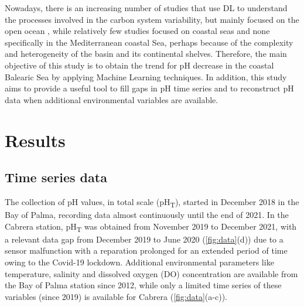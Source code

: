 Nowadays, there is an increasing number of studies that use  DL to
understand the processes involved in the carbon system variability, but mainly
focused on the open ocean \cite{Fourrier2020,Friedrich2009,Bittig2018,
    Landschützer2013,Broullon2019}, while relatively few studies focused on
coastal
seas \cite{Broullon2021,Contractor2021} and none specifically in the
Mediterranean coastal Sea, perhaps because of the complexity and heterogeneity
of the basin and its continental shelves. Therefore, the main objective of this
study is to obtain the trend for pH decrease in the coastal Balearic Sea by
applying Machine Learning techniques. In addition, this study aims to provide a
useful tool to fill gaps in pH time series and to reconstruct pH data when
additional environmental variables are available.

\section{Results}
\subsection{Time series data}

The collection of pH values, in total scale (pH\textsubscript{T}), started
in December 2018 in the Bay of Palma, recording data almost continuously until
the end of 2021. In the Cabrera station, pH\textsubscript{T} was obtained from
November 2019 to December 2021, with a relevant data gap from December 2019 to
June 2020 (\cref{fig:data}(d)) due to a sensor malfunction with a reparation
prolonged for an extended period of time owing to the Covid-19 lockdown.
Additional environmental parameters like temperature, salinity and dissolved
oxygen (DO) concentration are available from the Bay of Palma station since
2012, while only a limited time series of these variables (since 2019) is
available for Cabrera (\cref{fig:data}(a-c)).

